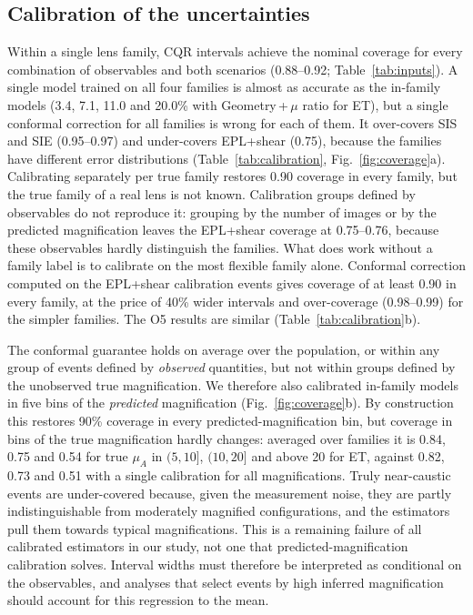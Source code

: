 \subsection{Calibration of the uncertainties}
\label{sec:calibration}
Within a single lens family, CQR intervals achieve the nominal coverage for every combination of observables and both scenarios (0.88--0.92; Table~\ref{tab:inputs}). A single model trained on all four families is almost as accurate as the in-family models (3.4, 7.1, 11.0 and 20.0\% with Geometry\,+\,$\mu$ ratio for ET), but a single conformal correction for all families is wrong for each of them. It over-covers SIS and SIE (0.95--0.97) and under-covers EPL+shear (0.75), because the families have different error distributions (Table~\ref{tab:calibration}, Fig.~\ref{fig:coverage}a). Calibrating separately per true family restores 0.90 coverage in every family, but the true family of a real lens is not known. Calibration groups defined by observables do not reproduce it: grouping by the number of images or by the predicted magnification leaves the EPL+shear coverage at 0.75--0.76, because these observables hardly distinguish the families. What does work without a family label is to calibrate on the most flexible family alone. Conformal correction computed on the EPL+shear calibration events gives coverage of at least 0.90 in every family, at the price of 40\% wider intervals and over-coverage (0.98--0.99) for the simpler families. The O5 results are similar (Table~\ref{tab:calibration}b).

The conformal guarantee holds on average over the population, or within any group of events defined by \emph{observed} quantities, but not within groups defined by the unobserved true magnification. We therefore also calibrated in-family models in five bins of the \emph{predicted} magnification (Fig.~\ref{fig:coverage}b). By construction this restores 90\% coverage in every predicted-magnification bin, but coverage in bins of the true magnification hardly changes: averaged over families it is 0.84, 0.75 and 0.54 for true $\mu_A$ in $(5,10]$, $(10,20]$ and above 20 for ET, against 0.82, 0.73 and 0.51 with a single calibration for all magnifications. Truly near-caustic events are under-covered because, given the measurement noise, they are partly indistinguishable from moderately magnified configurations, and the estimators pull them towards typical magnifications. This is a remaining failure of all calibrated estimators in our study, not one that predicted-magnification calibration solves. Interval widths must therefore be interpreted as conditional on the observables, and analyses that select events by high inferred magnification should account for this regression to the mean.

